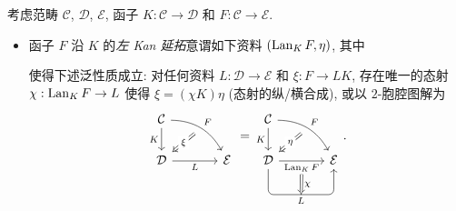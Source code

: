 \begin{definition}[D.\ Kan]\label{def:Kan-extension}
	考虑范畴 $\mathcal{C}$, $\mathcal{D}$, $\mathcal{E}$, 函子 $K: \mathcal{C} \to \mathcal{D}$ 和 $F: \mathcal{C} \to \mathcal{E}$.
	\begin{itemize}
		\item 函子 $F$ 沿 $K$ 的\emph{左 Kan 延拓}意谓如下资料 $(\operatorname{Lan}_K F, \eta)$, 其中
		使得下述泛性质成立: 对任何资料 $L: \mathcal{D} \to \mathcal{E}$ 和 $\xi: F \to LK$, 存在唯一的态射 $\chi: \operatorname{Lan}_K F \to L$ 使得 $\xi = (\chi K) \eta$ (态射的纵/横合成), 或以 $2$-胞腔图解为
		\[\begin{tikzcd}[column sep=large]
			\mathcal{C} \arrow[d, "K"'] \arrow[rd, bend left, "F", ""' {name=F}] & \\
			\mathcal{D} \arrow[r, "L"'] \arrow[Rightarrow, from=F, "\xi" description] & \mathcal{E}
		\end{tikzcd} = \begin{tikzcd}[column sep=large]
			\mathcal{C} \arrow[d, "K"'] \arrow[rd, bend left, "F", ""' {name=F}] & \\
			\mathcal{D} \arrow[r, "{\Lan_K F}"' name=A] \arrow[Rightarrow, from=F, "\eta" description] \arrow[r, "L"{below, name=B}, rounded corners, to path={-- ([yshift=-2em]\tikztostart.south) -- ([yshift=-2em] \tikztotarget.south) [midway]\tikztonodes -- (\tikztotarget) }] & \mathcal{E} \arrow[Rightarrow, from=A, to=B, "\chi"]
		\end{tikzcd}. \]
	

\end{itemize}
\end{definition}
